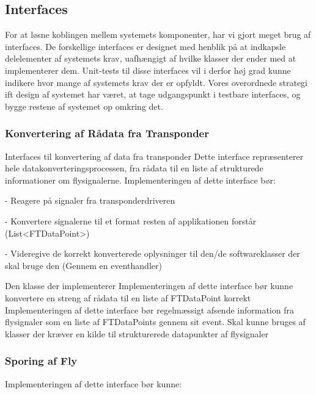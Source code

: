 

\subsection{Interfaces}
For at løsne koblingen mellem systemets komponenter, har vi gjort meget brug af interfaces. 
De forskellige interfaces er designet med henblik på at indkapsle delelementer af systemets krav, uafhængigt af hvilke klasser der ender med at implementerer dem.
Unit-tests til disse interfaces vil i derfor høj grad kunne indikere hvor mange af systemets krav der er opfyldt. Vores overordnede strategi ift design af systemet har været, at tage udgangspunkt i testbare interfaces, og bygge restene af systemet op omkring det.

\subsubsection{Konvertering af Rådata fra Transponder}
 {Interfaces til konvertering af data fra transponder}
Dette interface repræsenterer hele datakonverteringsprocessen, fra rådata til en liste af strukturede informationer om flysignalerne.
Implementeringen af dette interface bør:

- Reagere på signaler fra transponderdriveren

- Konvertere signalerne til et format resten af applikationen forstår (List<FTDataPoint>)

- Videregive de korrekt konverterede oplysninger til den/de softwareklasser der skal bruge den (Gennem en eventhandler)

Den klasse der implementerer
Implementeringen af dette interface bør kunne konvertere en streng af rådata til en liste af FTDataPoint korrekt
Implementeringen af dette interface bør regelmæssigt afsende information fra flysignaler som en liste af FTDataPoints gennem sit event. Skal kunne bruges af klasser der kræver en kilde til strukturerede datapunkter af flysignaler
\subsubsection{Sporing af Fly}


Implementeringen af dette interface bør kunne:

